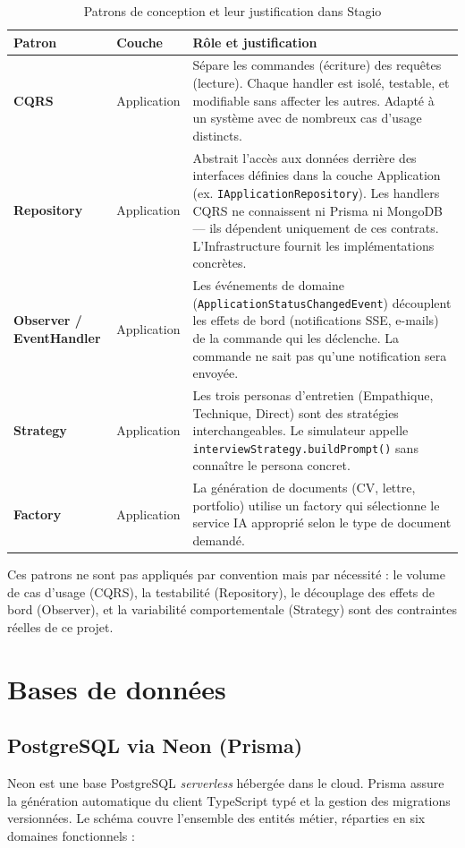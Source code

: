 ﻿\documentclass[12pt,a4paper]{report}
\begin{document}
\begin{table}[H]
\centering
\begin{tabularx}{\textwidth}{llX}
\toprule
\textbf{Patron} & \textbf{Couche} & \textbf{Rôle et justification} \\
\midrule
\textbf{CQRS} & Application & Sépare les commandes (écriture) des requêtes (lecture). Chaque handler est isolé, testable, et modifiable sans affecter les autres. Adapté à un système avec de nombreux cas d'usage distincts. \\
\textbf{Repository} & Application & Abstrait l'accès aux données derrière des interfaces définies dans la couche Application (ex. \texttt{IApplicationRepository}). Les handlers CQRS ne connaissent ni Prisma ni MongoDB — ils dépendent uniquement de ces contrats. L'Infrastructure fournit les implémentations concrètes. \\
\textbf{Observer / EventHandler} & Application & Les événements de domaine (\texttt{ApplicationStatusChangedEvent}) découplent les effets de bord (notifications SSE, e-mails) de la commande qui les déclenche. La commande ne sait pas qu'une notification sera envoyée. \\
\textbf{Strategy} & Application & Les trois personas d'entretien (Empathique, Technique, Direct) sont des stratégies interchangeables. Le simulateur appelle \texttt{interviewStrategy.buildPrompt()} sans connaître le persona concret. \\
\textbf{Factory} & Application & La génération de documents (CV, lettre, portfolio) utilise un factory qui sélectionne le service IA approprié selon le type de document demandé. \\
\bottomrule
\end{tabularx}
\caption{Patrons de conception et leur justification dans Stagio}
\end{table}

Ces patrons ne sont pas appliqués par convention mais par nécessité : le volume de cas d'usage (CQRS), la testabilité (Repository), le découplage des effets de bord (Observer), et la variabilité comportementale (Strategy) sont des contraintes réelles de ce projet.

\section{Bases de données}

\subsection{PostgreSQL via Neon (Prisma)}
Neon est une base PostgreSQL \textit{serverless} hébergée dans le cloud. Prisma assure la génération automatique du client TypeScript typé et la gestion des migrations versionnées. Le schéma couvre l'ensemble des entités métier, réparties en six domaines fonctionnels :
\end{document}
